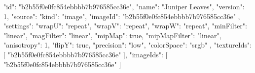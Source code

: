 {
  "id": "b2b55f0e0fc854ebbbb7b976585cc36e",
  "name": "Juniper Leaves",
  "version": 1,
  "source": {
    "kind": "image",
    "imageId": "b2b55f0e0fc854ebbbb7b976585cc36e"
  },
  "settings": {
    "wrapU": "repeat",
    "wrapV": "repeat",
    "wrapW": "repeat",
    "minFilter": "linear",
    "magFilter": "linear",
    "mipMap": true,
    "mipMapFilter": "linear",
    "anisotropy": 1,
    "flipY": true,
    "precision": "low",
    "colorSpace": "srgb"
  },
  "textureIds": [
    "b2b55f0e0fc854ebbbb7b976585cc36e"
  ],
  "imageIds": [
    "b2b55f0e0fc854ebbbb7b976585cc36e"
  ]
}
